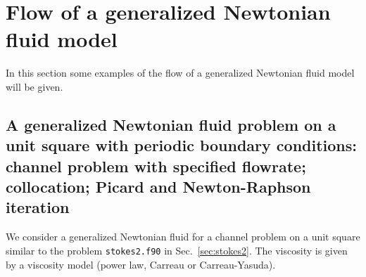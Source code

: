 
\def\headdate{28th March 2023}

\section{Flow of a generalized Newtonian fluid model}
\label{sec:gennewtonian}

In this section some examples of the flow of a generalized Newtonian fluid model
will be given. 

\subsection{A generalized Newtonian fluid problem on a unit square with periodic boundary
         conditions: channel problem with specified flowrate; collocation;
         Picard and Newton-Raphson iteration}
\label{sec:gennewtonian1and2}
                                                                                
We consider a generalized Newtonian fluid for a channel problem on a unit square
similar to the problem \texttt{stokes2.f90} in Sec.~\ref{sec:stokes2}. The
viscosity is given by a viscosity model (power law, Carreau or Carreau-Yasuda).
                                                                                
